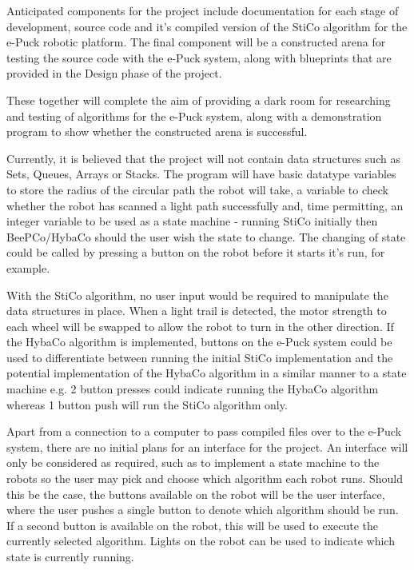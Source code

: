 Anticipated components for the project include documentation for each stage of
development, source code and it's compiled version of the StiCo algorithm for
the e-Puck robotic platform.  The final component will be a constructed arena
for testing the source code with the e-Puck system, along with blueprints that
are provided in the Design phase of the project.

These together will complete
the aim of providing a dark room for researching and testing of algorithms for
the e-Puck system, along with a demonstration program to show whether the 
constructed arena is successful.

Currently, it is believed that the project will not contain data structures
such as Sets, Queues, Arrays or Stacks.  The program will have basic datatype
variables to store the radius of the circular path the robot will take, a 
variable to check whether the robot has scanned a light path successfully and,
time permitting, an integer variable to be used as a state machine - running
StiCo initially then BeePCo/HybaCo should the user wish the state to change.
The changing of state could be called by pressing a button on the robot before
it starts it's run, for example.

With the StiCo algorithm, no user input would be required to manipulate the
data structures in place.  When a light trail is detected, the motor strength
to each wheel will be swapped to allow the robot to turn in the other 
direction.  If the HybaCo algorithm is implemented, buttons on the e-Puck 
system could be used to differentiate between running the initial StiCo
implementation and the potential implementation of the HybaCo algorithm in a
similar manner to a state machine e.g. 2 button presses could indicate running
the HybaCo algorithm whereas 1 button push will run the StiCo algorithm only.

Apart from a connection to a computer to pass compiled files over to the e-Puck
system, there are no initial plans for an interface for the project.  An 
interface will only be considered as required, such as to implement a state
machine to the robots so the user may pick and choose which algorithm each
robot runs.  Should this be the case, the buttons available on the robot will 
be the user interface, where the user pushes a single button to denote which
algorithm should be run.  If a second button is available on the robot, this
will be used to execute the currently selected algorithm.  Lights on the robot
can be used to indicate which state is currently running.

